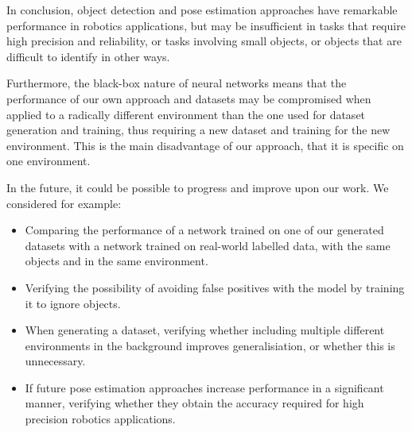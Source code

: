 In conclusion, object detection and pose estimation approaches have remarkable performance in robotics applications, but may be insufficient in tasks that require high precision and reliability, or tasks involving small objects, or objects that are difficult to identify in other ways.

Furthermore, the black-box nature of neural networks means that the performance of our own approach and datasets may be compromised when applied to a radically different environment than the one used for dataset generation and training, thus requiring a new dataset and training for the new environment. This is the main disadvantage of our approach, that it is specific on one environment.

In the future, it could be possible to progress and improve upon our work. We considered for example:
\begin{itemize}
    \item Comparing the performance of a network trained on one of our generated datasets with a network trained on real-world labelled data, with the same objects and in the same environment.
    \item Verifying the possibility of avoiding false positives with the model by training it to ignore objects.
    \item When generating a dataset, verifying whether including multiple different environments in the background improves generalisiation, or whether this is unnecessary.
    \item If future pose estimation approaches increase performance in a significant manner, verifying whether they obtain the accuracy required for high precision robotics applications.
\end{itemize}